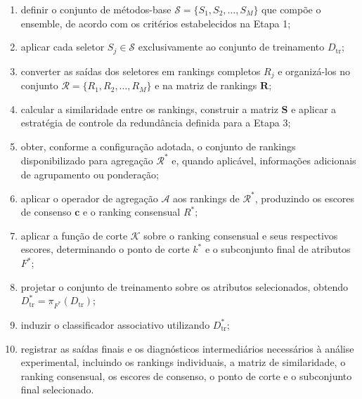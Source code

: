 \begin{enumerate}

    \item definir o conjunto de métodos-base
    $\mathcal{S}=\{S_1,S_2,\ldots,S_M\}$ que compõe o ensemble, de acordo com
    os critérios estabelecidos na Etapa 1;

    \item aplicar cada seletor $S_j\in\mathcal{S}$ exclusivamente ao conjunto
    de treinamento $D_{\mathrm{tr}}$;

    \item converter as saídas dos seletores em rankings completos
    $R_j$ e organizá-los no conjunto
    $\mathcal{R}=\{R_1,R_2,\ldots,R_M\}$ e na matriz de rankings
    $\mathbf{R}$;

    \item calcular a similaridade entre os rankings, construir a matriz
    $\mathbf{S}$ e aplicar a estratégia de controle da redundância definida
    para a Etapa 3;

    \item obter, conforme a configuração adotada, o conjunto de rankings
    disponibilizado para agregação $\mathcal{R}^{*}$ e, quando aplicável,
    informações adicionais de agrupamento ou ponderação;

    \item aplicar o operador de agregação $\mathcal{A}$ aos rankings de
    $\mathcal{R}^{*}$, produzindo os escores de consenso
    $\mathbf{c}$ e o ranking consensual $R^{*}$;

    \item aplicar a função de corte $\mathcal{K}$ sobre o ranking consensual e
    seus respectivos escores, determinando o ponto de corte $k^{*}$ e o
    subconjunto final de atributos $F^{*}$;

    \item projetar o conjunto de treinamento sobre os atributos selecionados,
    obtendo $D_{\mathrm{tr}}^{*}=\pi_{F^{*}}(D_{\mathrm{tr}})$;

    \item induzir o classificador associativo utilizando
    $D_{\mathrm{tr}}^{*}$;

    \item registrar as saídas finais e os diagnósticos intermediários
    necessários à análise experimental, incluindo os rankings individuais,
    a matriz de similaridade, o ranking consensual, os escores de consenso,
    o ponto de corte e o subconjunto final selecionado.

\end{enumerate}

